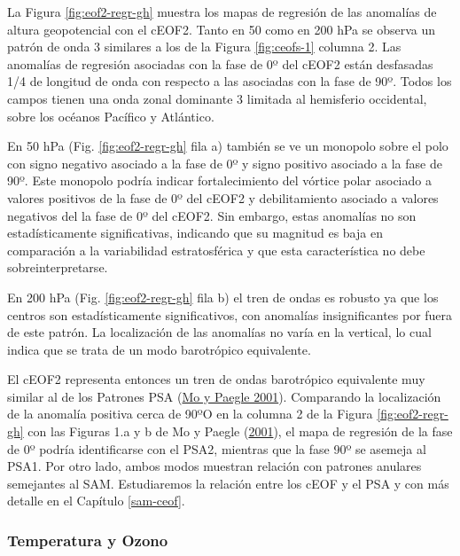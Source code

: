 \documentclass[12pt,oneside,a4paper]{reedthesis}
\begin{document}
La Figura \ref{fig:eof2-regr-gh} muestra los mapas de regresión de las anomalías de altura geopotencial con el cEOF2.
Tanto en 50 como en 200 hPa se observa un patrón de onda 3 similares a los de la Figura \ref{fig:ceofs-1} columna 2.
Las anomalías de regresión asociadas con la fase de 0º del cEOF2 están desfasadas 1/4 de longitud de onda con respecto a las asociadas con la fase de 90º.
Todos los campos tienen una onda zonal dominante 3 limitada al hemisferio occidental, sobre los océanos Pacífico y Atlántico.

En 50 hPa (Fig. \ref{fig:eof2-regr-gh} fila a) también se ve un monopolo sobre el polo con signo negativo asociado a la fase de 0º y signo positivo asociado a la fase de 90º.
Este monopolo podría indicar fortalecimiento del vórtice polar asociado a valores positivos de la fase de 0º del cEOF2 y debilitamiento asociado a valores negativos del la fase de 0º del cEOF2.
Sin embargo, estas anomalías no son estadísticamente significativas, indicando que su magnitud es baja en comparación a la variabilidad estratosférica y que esta característica no debe sobreinterpretarse.

En 200 hPa (Fig. \ref{fig:eof2-regr-gh} fila b) el tren de ondas es robusto ya que los centros son estadísticamente significativos, con anomalías insignificantes por fuera de este patrón.
La localización de las anomalías no varía en la vertical, lo cual indica que se trata de un modo barotrópico equivalente.

El cEOF2 representa entonces un tren de ondas barotrópico equivalente muy similar al de los Patrones PSA (\protect\hyperlink{ref-mo2001}{Mo y Paegle 2001}).
Comparando la localización de la anomalía positiva cerca de 90ºO en la columna 2 de la Figura \ref{fig:eof2-regr-gh} con las Figuras 1.a y b de Mo y Paegle (\protect\hyperlink{ref-mo2001}{2001}), el mapa de regresión de la fase de 0º podría identificarse con el PSA2, mientras que la fase 90º se asemeja al PSA1.
Por otro lado, ambos modos muestran relación con patrones anulares semejantes al SAM.
Estudiaremos la relación entre los cEOF y el PSA y con más detalle en el Capítulo \ref{sam-ceof}.

\hypertarget{temperatura-y-ozono}{%
\subsubsection{Temperatura y Ozono}\label{temperatura-y-ozono}}
\end{document}
